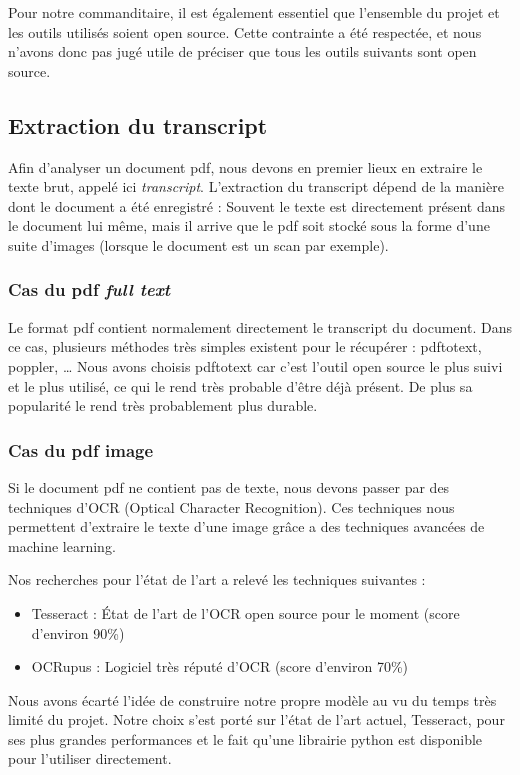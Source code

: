 
Pour notre commanditaire, il est également essentiel que l'ensemble du projet et les outils utilisés soient open source.
Cette contrainte a été respectée, et nous n'avons donc pas jugé utile de préciser que tous les outils suivants sont open source.

\subsection{Extraction du transcript}
Afin d'analyser un document pdf, nous devons en premier lieux en extraire le texte brut, appelé ici \textit{transcript}.
L'extraction du transcript dépend de la manière dont le document a été enregistré : Souvent le texte est directement présent dans le document lui même, mais il arrive que le pdf soit stocké sous la forme d'une suite d'images (lorsque le document est un scan par exemple).

\subsubsection {Cas du pdf \textit{full text}}
Le format pdf contient normalement directement le transcript du document.
Dans ce cas, plusieurs méthodes très simples existent pour le récupérer : pdftotext, poppler, \ldots 
Nous avons choisis pdftotext car c'est l'outil open source le plus suivi et le plus utilisé, ce qui le rend très probable d'être déjà présent.
De plus sa popularité le rend très probablement plus durable.

\subsubsection {Cas du pdf image}
Si le document pdf ne contient pas de texte, nous devons passer par des techniques d'OCR (Optical Character Recognition).
Ces techniques nous permettent d'extraire le texte d'une image grâce a des techniques avancées de machine learning.

Nos recherches pour l'état de l'art a relevé les techniques suivantes :
\begin {itemize}
\item Tesseract : État de l'art de l'OCR open source pour le moment (score d'environ 90\%)
\item OCRupus : Logiciel très réputé d'OCR (score d'environ 70\%)
\end {itemize}
Nous avons écarté l'idée de construire notre propre modèle au vu du temps très limité du projet.
Notre choix s'est porté sur l'état de l'art actuel, Tesseract, pour ses plus grandes performances et le fait qu'une librairie python est disponible pour l'utiliser directement.

